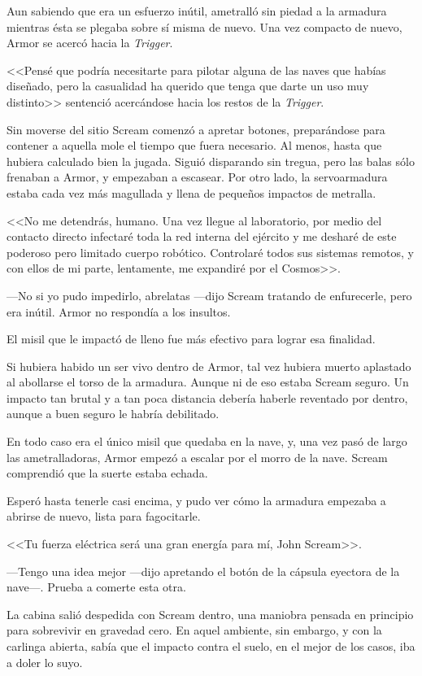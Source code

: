 Aun sabiendo que era un esfuerzo inútil, ametralló sin piedad a la armadura mientras ésta se plegaba sobre sí misma de nuevo. Una vez compacto de nuevo, Armor se acercó hacia la \emph{Trigger}.

<<Pensé que podría necesitarte para pilotar alguna de las naves que habías diseñado, pero la casualidad ha querido que tenga que darte un uso muy distinto>> sentenció acercándose hacia los restos de la \emph{Trigger}.

Sin moverse del sitio Scream comenzó a apretar botones, preparándose para contener a aquella mole el tiempo que fuera necesario. Al menos, hasta que hubiera calculado bien la jugada. Siguió disparando sin tregua, pero las balas sólo frenaban a Armor, y empezaban a escasear. Por otro lado, la servoarmadura estaba cada vez más magullada y llena de pequeños impactos de metralla.

<<No me detendrás, humano. Una vez llegue al laboratorio, por medio del contacto directo infectaré toda la red interna del ejército y me desharé de este poderoso pero limitado cuerpo robótico. Controlaré todos sus sistemas remotos, y con ellos de mi parte, lentamente, me expandiré por el Cosmos>>.

---No si yo pudo impedirlo, abrelatas ---dijo Scream tratando de enfurecerle, pero era inútil. Armor no respondía a los insultos.

El misil que le impactó de lleno fue más efectivo para lograr esa finalidad.

Si hubiera habido un ser vivo dentro de Armor, tal vez hubiera muerto aplastado al abollarse el torso de la armadura. Aunque ni de eso estaba Scream seguro. Un impacto tan brutal y a tan poca distancia debería haberle reventado por dentro, aunque a buen seguro le habría debilitado.

En todo caso era el único misil que quedaba en la nave, y, una vez pasó de largo las ametralladoras, Armor empezó a escalar por el morro de la nave. Scream comprendió que la suerte estaba echada.

Esperó hasta tenerle casi encima, y pudo ver cómo la armadura empezaba a abrirse de nuevo, lista para fagocitarle.

<<Tu fuerza eléctrica será una gran energía para mí, John Scream>>.

---Tengo una idea mejor ---dijo apretando el botón de la cápsula eyectora de la nave---. Prueba a comerte esta otra.

La cabina salió despedida con Scream dentro, una maniobra pensada en principio para sobrevivir en gravedad cero. En aquel ambiente, sin embargo, y con la carlinga abierta, sabía que el impacto contra el suelo, en el mejor de los casos, iba a doler lo suyo.

